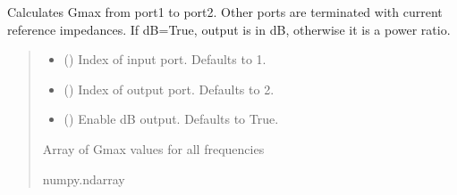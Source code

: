 \documentclass[letterpaper,10pt,english]{sphinxmanual}
\begin{document}
\begin{fulllineitems}
\begin{fulllineitems}
\label{\detokenize{touchstone:touchstone.spfile.getfilename}}
\pysigstartsignatures
{}
\pysigstopsignatures
\end{fulllineitems}


\begin{fulllineitems}
\label{\detokenize{touchstone:touchstone.spfile.gmax}}
\pysigstartsignatures
{}
\pysigstopsignatures
\sphinxAtStartPar
Calculates Gmax from port1 to port2. Other ports are terminated with current reference impedances. If dB=True, output is in dB, otherwise it is a power ratio.
\begin{quote}\begin{description}
\begin{itemize}
\item {}
\sphinxAtStartPar
{} (\sphinxstyleliteralemphasis{\sphinxupquote{, }}) \textendash{} Index of input port. Defaults to 1.

\item {}
\sphinxAtStartPar
{} (\sphinxstyleliteralemphasis{\sphinxupquote{, }}) \textendash{} Index of output port. Defaults to 2.

\item {}
\sphinxAtStartPar
{} (\sphinxstyleliteralemphasis{\sphinxupquote{, }}) \textendash{} Enable dB output. Defaults to True.

\end{itemize}

\sphinxAtStartPar
Array of Gmax values for all frequencies

\sphinxAtStartPar
numpy.ndarray


\end{description}
\end{quote}
\end{fulllineitems}
\end{fulllineitems}
\end{document}
